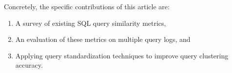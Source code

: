 

%

Concretely, the specific contributions of this article are:
\begin{enumerate}
\item A survey of existing SQL query similarity metrics,
\item An evaluation of these metrics on multiple query logs, and 
\item Applying query standardization techniques to improve 
query clustering accuracy. %
\end{enumerate}

